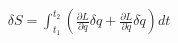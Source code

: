 \documentclass[preview]{standalone}
\begin{document}
\begin{align*}
\delta S = \int_{t_1}^{t_2} \left( \frac{\partial L}{\partial q} \delta q + \frac{\partial L}{\partial \dot{q}} \delta \dot{q} \right) dt
\end{align*}
\end{document}
